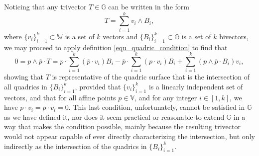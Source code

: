 \documentclass{birkjour}
\theoremstyle{definition}
\theoremstyle{remark}
\numberwithin{equation}{section}
\newcommand{\G}{\mathbb{G}}
\newcommand{\V}{\mathbb{V}}
\newcommand{\W}{\mathbb{W}}
\begin{document}
Noticing that any trivector $T\in\G$ can be written in the form
\begin{equation}
T = \sum_{i=1}^k v_i\wedge B_i,
\end{equation}
where $\{v_i\}_{i=1}^k\subset\W$ is a set of $k$ vectors and $\{B_i\}_{i=1}^k\subset\G$
is a set of $k$ bivectors, we may proceed to apply definition \eqref{equ_quadric_condition}
to find that
\begin{equation}\label{equ_trivector_geo}
0 = p\wedge\overline{p}\cdot T =
p\cdot\sum_{i=1}^k(\overline{p}\cdot v_i)B_i -
\overline{p}\cdot\sum_{i=1}^k(p\cdot v_i)B_i +
\sum_{i=1}^k(p\wedge\overline{p}\cdot B_i)v_i,
\end{equation}
showing that $T$ is representative of the quadric surface that is the intersection
of all quadrics in $\{B_i\}_{i=1}^k$, provided that $\{v_i\}_{i=1}^k$ is a linearly
independent set of vectors, and that for all affine points $p\in\V$, and for any
integer $i\in[1,k]$, we have $p\cdot v_i=\overline{p}\cdot v_i=0$.  This last condition,
unfortunately, cannot be satisfied in $\G$ as we have defined it, nor does it seem
practical or reasonable to extend $\G$ in a way that makes the condition possible,
mainly because the resulting trivector would not appear capable of ever directly characterizing the
intersection, but only indirectly as the intersection of the quadrics in $\{B_i\}_{i=1}^k$.

\end{document}
